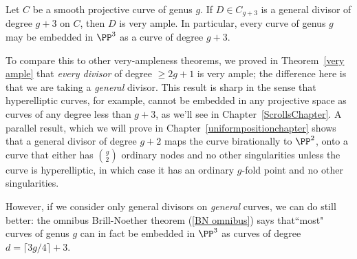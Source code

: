 \begin{theorem}\label{g+3 theorem}
Let $C$ be a smooth projective curve of genus $g$. If $D \in C_{g+3}$ is a general divisor of degree $g+3$ on $C$, then 
$D$ is very ample. In particular, every curve of genus $g$ may be embedded in $\PP^{3}$ as a curve of degree $g+3$.
\end{theorem}

To compare this to other very-ampleness theorems, we proved in Theorem~\ref{very ample} that \emph{every divisor} of degree $\geq 2g+1$ is very ample; the difference here is that we are taking a \emph{general} divisor. This result is sharp in the sense that hyperelliptic curves, for example, cannot be embedded in any projective space as curves of any degree less than $g+3$, as we'll see in Chapter~\ref{ScrollsChapter}. A parallel result, which we will prove in Chapter~\ref{uniformpositionchapter} shows that a general divisor of degree $g+2$ maps the curve birationally to $\PP^2$, onto a curve that either has $\binom{g}{2}$ ordinary nodes and no other singularities unless the curve
is hyperelliptic, in which case it has an ordinary $g$-fold point and no other singularities.

However, if we consider only general divisors on \emph{general} curves, we can do still better: the omnibus Brill-Noether theorem (\ref{BN omnibus}) says that``most" curves of genus $g$ can in fact be embedded in $\PP^{3}$ as curves of degree $d = \lceil 3g/4 \rceil + 3$.


